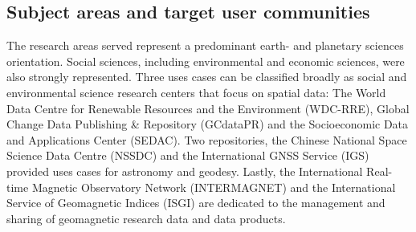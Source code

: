 \documentclass{interact}
\begin{document}
\subsection{Subject areas and target user communities}\label{subjects}
The research areas served represent a predominant earth- and planetary sciences orientation. Social sciences, including environmental and economic sciences, were also strongly represented. Three uses cases can be classified broadly as social and environmental science research centers that focus on spatial data: The World Data Centre for Renewable Resources and the Environment (WDC-RRE), Global Change Data Publishing \& Repository (GCdataPR) and the Socioeconomic Data and Applications Center (SEDAC). Two repositories, the Chinese National Space Science Data Centre (NSSDC) and the International GNSS Service (IGS) provided uses cases for astronomy and geodesy. Lastly, the International Real-time Magnetic Observatory Network (INTERMAGNET) and the International Service of Geomagnetic Indices (ISGI) are dedicated to the management and sharing of geomagnetic research data and data products.
\end{document}
